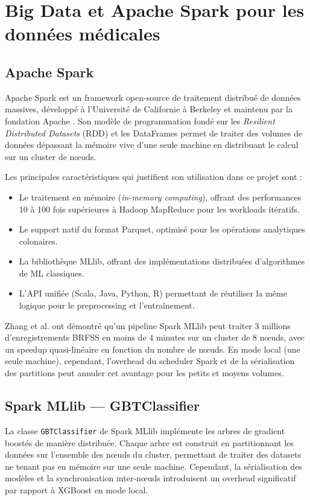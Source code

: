 \section{Big Data et Apache Spark pour les données médicales}

\subsection{Apache Spark}

Apache Spark est un framework open-source de traitement distribué de données massives, développé à l'Université de Californie à Berkeley et maintenu par la fondation Apache \cite{zaharia2016}. Son modèle de programmation fondé sur les \textit{Resilient Distributed Datasets} (RDD) et les DataFrames permet de traiter des volumes de données dépassant la mémoire vive d'une seule machine en distribuant le calcul sur un cluster de nœuds.

Les principales caractéristiques qui justifient son utilisation dans ce projet sont :
\begin{itemize}
    \item Le traitement en mémoire (\textit{in-memory computing}), offrant des performances 10 à 100 fois supérieures à Hadoop MapReduce pour les workloads itératifs.
    \item Le support natif du format Parquet, optimisé pour les opérations analytiques colonaires.
    \item La bibliothèque MLlib, offrant des implémentations distribuées d'algorithmes de ML classiques.
    \item L'API unifiée (Scala, Java, Python, R) permettant de réutiliser la même logique pour le preprocessing et l'entraînement.
\end{itemize}

Zhang et al. \cite{zhang2023} ont démontré qu'un pipeline Spark MLlib peut traiter 3 millions d'enregistrements BRFSS en moins de 4 minutes sur un cluster de 8 nœuds, avec un speedup quasi-linéaire en fonction du nombre de nœuds. En mode local (une seule machine), cependant, l'overhead du scheduler Spark et de la sérialisation des partitions peut annuler cet avantage pour les petits et moyens volumes.

\subsection{Spark MLlib --- GBTClassifier}

La classe \texttt{GBTClassifier} de Spark MLlib implémente les arbres de gradient boostés de manière distribuée. Chaque arbre est construit en partitionnant les données sur l'ensemble des nœuds du cluster, permettant de traiter des datasets ne tenant pas en mémoire sur une seule machine. Cependant, la sérialisation des modèles et la synchronisation inter-nœuds introduisent un overhead significatif par rapport à XGBoost en mode local.

